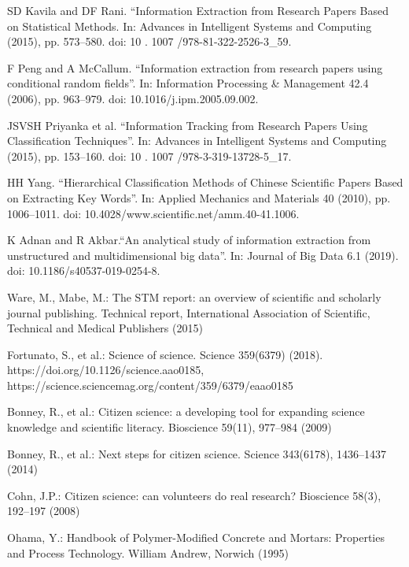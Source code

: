 \documentclass[twocolumn]{article}
\begin{document}
\begin{thebibliography}{12}
SD Kavila and DF Rani. “Information Extraction from Research Papers Based on Statistical Methods. In: Advances in Intelligent Systems and Computing (2015), pp. 573–580. doi: 10 . 1007 /978-81-322-2526-3\_59.

F Peng and A McCallum. “Information extraction from research papers using conditional random fields”. In: Information Processing \& Management 42.4 (2006), pp. 963–979. doi: 10.1016/j.ipm.2005.09.002.

JSVSH Priyanka et al. “Information Tracking from Research Papers Using Classification Techniques”. In: Advances in Intelligent Systems and Computing (2015), pp. 153–160. doi: 10 . 1007 /978-3-319-13728-5\_17.

HH Yang. “Hierarchical Classification Methods of Chinese Scientific Papers Based on Extracting Key Words”. In: Applied Mechanics and Materials 40 (2010), pp. 1006–1011. doi: 10.4028/www.scientific.net/amm.40-41.1006.

K Adnan and R Akbar.“An analytical study of information extraction from unstructured and multidimensional big data”. In: Journal of Big Data 6.1 (2019). doi: 10.1186/s40537-019-0254-8.

Ware, M., Mabe, M.: The STM report: an overview of scientific and scholarly journal publishing. Technical report, International Association of Scientific, Technical and Medical Publishers (2015)

Fortunato, S., et al.: Science of science. Science 359(6379) (2018).  https://doi.org/10.1126/science.aao0185, https://science.sciencemag.org/content/359/6379/eaao0185

Bonney, R., et al.: Citizen science: a developing tool for expanding science knowledge and scientific literacy. Bioscience 59(11), 977–984 (2009)

Bonney, R., et al.: Next steps for citizen science. Science 343(6178), 1436–1437 (2014)

Cohn, J.P.: Citizen science: can volunteers do real research? Bioscience 58(3), 192–197 (2008)

Ohama, Y.: Handbook of Polymer-Modified Concrete and Mortars: Properties and Process Technology. William Andrew, Norwich (1995)


\end{thebibliography}
\end{document}
